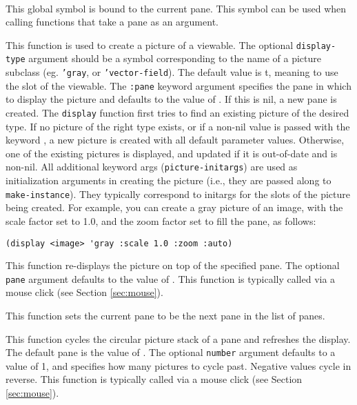 \begin{description}
\item{} \\
This global symbol is bound to the current pane.  This symbol can be
used when calling functions that take a pane as an argument.

\item{}
This function is used to create a picture of a viewable.  The optional
{\tt display-type} argument should be a symbol corresponding to the
name of a picture subclass (eg. {\tt 'gray}, or {\tt 'vector-field}).
The default value is t, meaning to use the  slot of
the viewable.  The {\tt :pane} keyword argument specifies the pane in
which to display the picture and defaults to the value of
.  If this is nil, a new pane is created.  The
{\tt display} function first tries to find an existing picture of the
desired type.  If no picture of the right type exists, or if a non-nil
value is passed with the keyword , a new picture is
created with all default parameter values.  Otherwise, one of the
existing pictures is displayed, and updated if it is out-of-date and
 is non-nil.  
All additional keyword args ({\tt picture-initargs}) are used as
initialization arguments in creating the picture (i.e., they are
passed along to {\tt make-instance}).  They typically correspond to
initargs for the slots of the picture being created.  For example, you
can create a gray picture of an image, with the scale factor set to
1.0, and the zoom factor set to fill the pane, as follows:
\begin{verbatim}
(display <image> 'gray :scale 1.0 :zoom :auto)
\end{verbatim}

\item{}
This function re-displays the picture on top of the specified pane.
The optional {\tt pane} argument defaults to the value of
.  This function is typically called via a mouse
click (see Section \ref{sec:mouse}).

\item{}
This function sets the current pane to be the next pane in the list of panes.

\item{}
This function cycles the circular picture stack of a pane and
refreshes the display.  The default pane is the value of
.  The optional {\tt number} argument defaults to
a value of 1, and specifies how many pictures to cycle past.  Negative
values cycle in reverse. This function is typically called via a mouse
click (see Section \ref{sec:mouse}).


\end{description}
